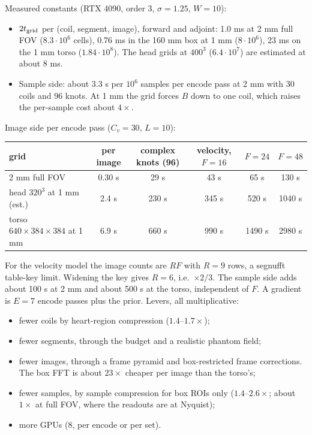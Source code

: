 \documentclass[11pt]{article}
\theoremstyle{remark}
\begin{document}
Measured constants (RTX 4090, order 3, $\sigma=1.25$, $W=10$):
\begin{itemize}
  \item $2t_{\rm grid}$ per (coil, segment, image), forward and adjoint: 1.0 ms at 2 mm full FOV ($8.3\cdot10^6$ cells), 0.76 ms in the 160 mm box at 1 mm ($8\cdot10^6$), 23 ms on the 1 mm torso ($1.84\cdot10^8$). The head grids at $400^3$ ($6.4\cdot10^7$) are estimated at about 8 ms.
  \item Sample side: about $3.3$ s per $10^6$ samples per encode pass at 2 mm with 30 coils and 96 knots. At 1 mm the grid forces $B$ down to one coil, which raises the per-sample cost about $4\times$.
\end{itemize}
Image side per encode pass ($C_v=30$, $L=10$):
\begin{center}\small
\begin{tabular}{lccccc}
\toprule
grid & per image & complex knots (96) & velocity, $F=16$ & $F=24$ & $F=48$\\
\midrule
2 mm full FOV & 0.30 s & 29 s & 43 s & 65 s & 130 s\\
head $320^3$ at 1 mm (est.) & 2.4 s & 230 s & 345 s & 520 s & 1040 s\\
torso $640{\times}384{\times}384$ at 1 mm & 6.9 s & 660 s & 990 s & 1490 s & 2980 s\\
\bottomrule
\end{tabular}
\end{center}
For the velocity model the image counts are $RF$ with $R=9$ rows, a segnufft table-key limit. Widening the key gives $R=6$, i.e.\ $\times2/3$. The sample side adds about 100 s at 2 mm and about 500 s at the torso, independent of $F$. A gradient is $E=7$ encode passes plus the prior.
Levers, all multiplicative:
\begin{itemize}
  \item fewer coils by heart-region compression ($1.4$--$1.7\times$);
  \item fewer segments, through the budget and a realistic phantom field;
  \item fewer images, through a frame pyramid and box-restricted frame corrections. The box FFT is about $23\times$ cheaper per image than the torso's;
  \item fewer samples, by sample compression for box ROIs only ($1.4$--$2.6\times$; about $1\times$ at full FOV, where the readouts are at Nyquist);
  \item more GPUs (8, per encode or per set).
\end{itemize}
\end{document}
